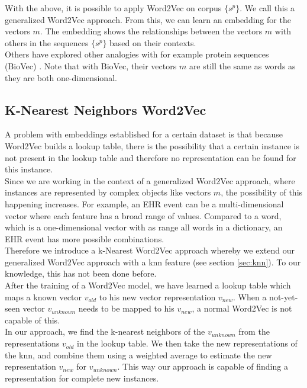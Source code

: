 With the above, it is possible to apply Word2Vec on corpus $\{s^p\}$. We call this a generalized Word2Vec approach. From this, we can learn an embedding for the vectors $m$. The embedding shows the relationships between the vectors $m$ with others in the sequences $\{s^p\}$ based on their contexts. \\
Others have explored other analogies with for example protein sequences (BioVec) \cite{protvec:article}. Note that with BioVec, their vectors $m$ are still the same as words as they are both one-dimensional.


\subsection{K-Nearest Neighbors Word2Vec}

A problem with embeddings established for a certain dataset is that because Word2Vec builds a lookup table, there is the possibility that a certain instance is not present in the lookup table and therefore no representation can be found for this instance. \\ 
Since we are working in the context of a generalized Word2Vec approach, where instances are represented by complex objects like vectors $m$, the possibility of this happening increases. For example, an EHR event can be a multi-dimensional vector where each feature has a broad range of values. Compared to a word, which is a one-dimensional vector with as range all words in a dictionary, an EHR event has more possible combinations. \\

Therefore we introduce a k-Nearest Word2Vec approach whereby we extend our generalized Word2Vec approach with a knn feature (see section \ref{sec:knn}). To our knowledge, this has not been done before. \\

After the training of a Word2Vec model, we have learned a lookup table which maps a known vector $v_{old}$ to his new vector representation $v_{new}$. When a not-yet-seen vector $v_{unknown}$ needs to be mapped to his $v_{new}$, a normal Word2Vec is not capable of this. \\
In our approach, we find the k-nearest neighbors of the $v_{unknown}$ from the representations $v_{old}$ in the lookup table. We then take the new representations of the knn, and combine them using a weighted average to estimate the new representation $v_{new}$ for $v_{unknown}$. This way our approach is capable of finding a representation for complete new instances. \\

